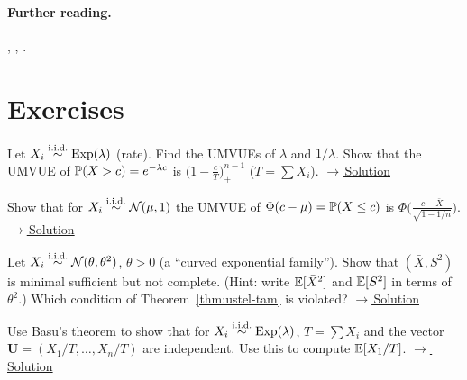 \documentclass[main.tex]{subfiles}
\begin{document}
\paragraph{Further reading.} \cite[Sections~6.2 and 7.3]{casella}, \cite[Sections~1.6 and 2.1]{lehmann-casella}, \cite[Section~4.3]{lehmann-romano}.

\section{Exercises}

\begin{exercise}\label{exr:10-1}
Let $X_i\iid\text{Exp}(\lambda)$ (rate). Find the UMVUEs of $\lambda$ and $1/\lambda$. Show that the UMVUE of $\P(X>c)=e^{-\lambda c}$ is $\big(1-\frac{c}{T}\big)_+^{n-1}$ ($T=\sum X_i$).
\hfill\hyperref[coz:10-1]{\footnotesize$\rightarrow$\,Solution}
\end{exercise}

\begin{exercise}\label{exr:10-2}
Show that for $X_i\iid\Normal(\mu,1)$ the UMVUE of $\Phi(c-\mu)=\P(X\le c)$ is $\Phi\Big(\frac{c-\bar X}{\sqrt{1-1/n}}\Big)$.
\hfill\hyperref[coz:10-2]{\footnotesize$\rightarrow$\,Solution}
\end{exercise}

\begin{exercise}\label{exr:10-3}
Let $X_i\iid\Normal(\theta,\theta^2)$, $\theta>0$ (a ``curved exponential family''). Show that $(\bar X,S^2)$ is minimal sufficient but not complete. (Hint: write $\E[\bar X^2]$ and $\E[S^2]$ in terms of $\theta^2$.) Which condition of Theorem~\ref{thm:ustel-tam} is violated?
\hfill\hyperref[coz:10-3]{\footnotesize$\rightarrow$\,Solution}
\end{exercise}

\begin{exercise}\label{exr:10-4}
Use Basu's theorem to show that for $X_i\iid\text{Exp}(\lambda)$, $T=\sum X_i$ and the vector $\mathbf{U}=(X_1/T,\dots,X_n/T)$ are independent. Use this to compute $\E[X_1/T]$.
\hfill\hyperref[coz:10-4]{\footnotesize$\rightarrow$\,Solution}
\end{exercise}

\end{document}
